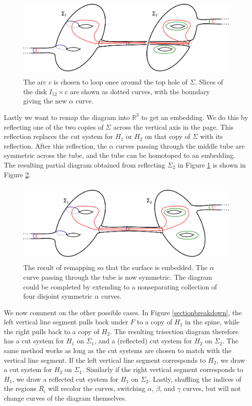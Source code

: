 \documentclass[12pt]{amsart}
\newcommand{\R}{\mathbb{R}}
\theoremstyle{definition}
\theoremstyle{remark}
\begin{document}
\begin{figure}[h]
\centering
\includegraphics[height=1.6in]{coresubsurfacediagram.png}
\caption{The arc $c$ is chosen to loop once around the top hole of $\Sigma$.
Slices of the disk $I_{12} \times c$ are shown as dotted curves, with the boundary giving the new $\alpha$ curve.}
\label{fig_coresubsurfacediagram}
\end{figure}

Lastly we want to remap the diagram into $\R^3$ to get an embedding.
We do this by reflecting one of the two copies of $\Sigma$ across the vertical axis in the page.
This reflection replaces the cut system for $H_1$ or $H_2$ on that copy of $\Sigma$ with its reflection.
After this reflection, the $\alpha$ curves passing through the middle tube are symmetric across the tube, and the tube can be homotoped to an embedding.
The resulting partial diagram obtained from reflecting $\Sigma_2$ in Figure \ref{fig_coresubsurfacediagram} is shown in Figure \ref{fig_coresubsurfacediagram_embedded}.

\begin{figure}[h]
\centering
\includegraphics[height=1.6in]{coresubsurfacediagram_embedded.png}
\caption{The result of remapping so that the surface is embedded.
The $\alpha$ curve passing through the tube is now symmetric.
The diagram could be completed by extending to a nonseparating collection of four disjoint symmetric $\alpha$ curves.}
\label{fig_coresubsurfacediagram_embedded}
\end{figure}

We now comment on the other possible cases.
In Figure \ref{sectionbreakdown}, the left vertical line segment pulls back under $F$ to a copy of $H_1$ in the spine, while the right pulls back to a copy of $H_2$.
The resulting trisection diagram therefore has a cut system for $H_1$ on $\Sigma_1$, and a (reflected) cut system for $H_2$ on $\Sigma_2$.
The same method works as long as the cut systems are chosen to match with the vertical line segment.
If the left vertical line segment corresponds to $H_2$, we draw a cut system for $H_2$ on $\Sigma_1$.
Similarly if the right vertical segment corresponds to $H_1$, we draw a reflected cut system for $H_1$ on $\Sigma_2$.
Lastly, shuffling the indices of the regions $R_i$ will recolor the curves, switching $\alpha$, $\beta$, and $\gamma$ curves, but will not change curves of the diagram themselves.
\end{document}

